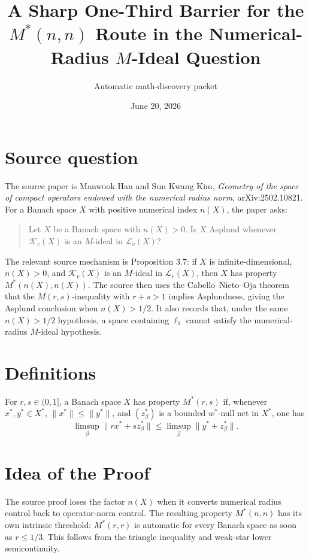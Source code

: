 \documentclass[11pt]{article}
\title{A Sharp One-Third Barrier for the \(M^*(n,n)\) Route in the Numerical-Radius \(M\)-Ideal Question}
\author{Automatic math-discovery packet}
\date{June 20, 2026}
\newcommand{\weakstar}{w^*}
\begin{document}
\maketitle

\section*{Source question}

The source paper is Manwook Han and Sun Kwang Kim,
\emph{Geometry of the space of compact operators endowed with the numerical radius norm},
arXiv:2502.10821.  For a Banach space \(X\) with positive numerical index \(n(X)\), the paper asks:

\begin{quote}
Let \(X\) be a Banach space with \(n(X)>0\). Is \(X\) Asplund whenever
\(\mathcal K_v(X)\) is an \(M\)-ideal in \(\mathcal L_v(X)\)?
\end{quote}

The relevant source mechanism is Proposition 3.7: if \(X\) is infinite-dimensional,
\(n(X)>0\), and \(\mathcal K_v(X)\) is an \(M\)-ideal in \(\mathcal L_v(X)\), then \(X\) has
property \(M^*(n(X),n(X))\).  The source then uses the Cabello--Nieto--Oja
theorem that the \(M(r,s)\)-inequality with \(r+s>1\) implies Asplundness, giving
the Asplund conclusion when \(n(X)>1/2\).  It also records that, under the same
\(n(X)>1/2\) hypothesis, a space containing \(\ell_1\) cannot satisfy the
numerical-radius \(M\)-ideal hypothesis.

\section*{Definitions}

For \(r,s\in(0,1]\), a Banach space \(X\) has property \(M^*(r,s)\) if, whenever
\(x^*,y^*\in X^*\), \(\|x^*\|\leq \|y^*\|\), and \((z_\beta^*)\) is a bounded
\(\weakstar\)-null net in \(X^*\), one has
\[
    \limsup_\beta \|r x^*+s z_\beta^*\|
    \leq
    \limsup_\beta \|y^*+z_\beta^*\|.
\]

\section*{Idea of the Proof}

The source proof loses the factor \(n(X)\) when it converts numerical radius
control back to operator-norm control.  The resulting property \(M^*(n,n)\)
has its own intrinsic threshold: \(M^*(r,r)\) is automatic for every Banach
space as soon as \(r\leq 1/3\).  This follows from the triangle inequality and
weak-star lower semicontinuity.
\end{document}
